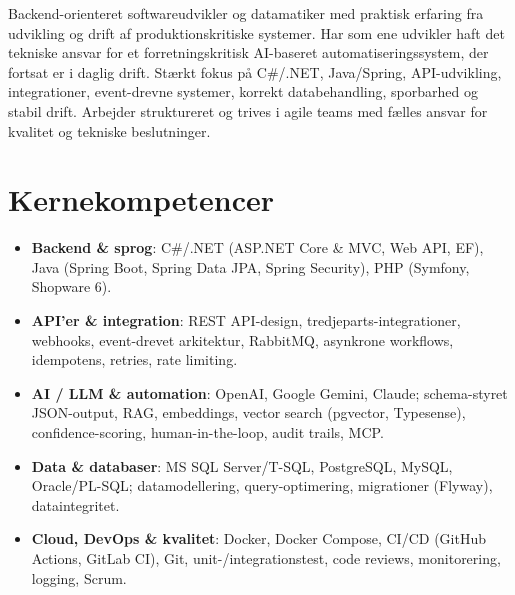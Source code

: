 \documentclass[11pt,a4paper,sans]{moderncv}
\begin{document}
\makecvtitle


\vspace{6pt}
\small{Backend-orienteret softwareudvikler og datamatiker med praktisk erfaring fra udvikling og drift af produktionskritiske systemer. Har som ene udvikler haft det tekniske ansvar for et forretningskritisk AI-baseret automatiseringssystem, der fortsat er i daglig drift. Stærkt fokus på C\#/.NET, Java/Spring, API-udvikling, integrationer, event-drevne systemer, korrekt databehandling, sporbarhed og stabil drift. Arbejder struktureret og trives i agile teams med fælles ansvar for kvalitet og tekniske beslutninger.}


\section{Kernekompetencer}
\vspace{1pt}
\begin{itemize}

\item \textbf{Backend \& sprog}: C\#/.NET (ASP.NET Core \& MVC, Web API, EF), Java (Spring Boot, Spring Data JPA, Spring Security), PHP (Symfony, Shopware 6).

\item \textbf{API'er \& integration}: REST API-design, tredjeparts-integrationer, webhooks, event-drevet arkitektur, RabbitMQ, asynkrone workflows, idempotens, retries, rate limiting.

\item \textbf{AI / LLM \& automation}: OpenAI, Google Gemini, Claude; schema-styret JSON-output, RAG, embeddings, vector search (pgvector, Typesense), confidence-scoring, human-in-the-loop, audit trails, MCP.

\item \textbf{Data \& databaser}: MS SQL Server/T-SQL, PostgreSQL, MySQL, Oracle/PL-SQL; datamodellering, query-optimering, migrationer (Flyway), dataintegritet.

\item \textbf{Cloud, DevOps \& kvalitet}: Docker, Docker Compose, CI/CD (GitHub Actions, GitLab CI), Git, unit-/integrationstest, code reviews, monitorering, logging, Scrum.

\end{itemize}
\end{document}
